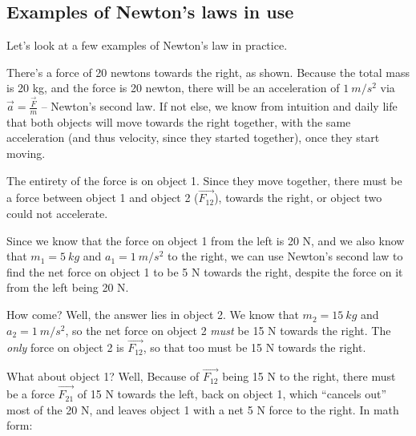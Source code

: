 \subsection{Examples of Newton's laws in use}

Let's look at a few examples of Newton's law in practice.

\begin{figure}[H]
     \centering
{}
\end{figure}



There's a force of 20 newtons towards the right, as shown. Because the total mass is 20 kg, and the force is 20 newton, there will be an acceleration of $\SI{1}{m/s^2}$ via $\displaystyle \vec{a} = \frac{\vec{F}}{m}$ -- Newton's second law. If not else, we know from intuition and daily life that both objects will move towards the right together, with the same acceleration (and thus velocity, since they started together), once they start moving.

The entirety of the force is on object 1. Since they move together, there must be a force between object 1 and object 2 ($\vec{F_{12}}$), towards the right, or object two could not accelerate.

Since we know that the force on object 1 from the left is 20 N, and we also know that $m_1 = \SI{5}{kg}$ and $a_1 = \SI{1}{m/s^2}$ to the right, we can use Newton's second law to find the net force on object 1 to be 5 N towards the right, despite the force on it from the left being 20 N.

How come? Well, the answer lies in object 2. We know that $m_2 = \SI{15}{kg}$ and $a_2 = \SI{1}{m/s^2}$, so the net force on object 2 \emph{must} be 15 N towards the right. The \emph{only} force on object 2 is $\vec{F_{12}}$, so that too must be 15 N towards the right.

What about object 1? Well, Because of $\vec{F_{12}}$ being 15 N to the right, there must be a force $\vec{F_{21}}$ of 15 N towards the left, back on object 1, which ``cancels out'' most of the 20 N, and leaves object 1 with a net 5 N force to the right. In math form:

